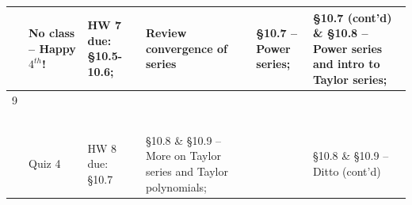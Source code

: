 \documentclass[11pt]{article}
\begin{document}
\begin{table}[ht!]
{\begin{tabular}{ | l | l | l | l | l | l |}
 & \begin{minipage}{0.18\textwidth}
No class -- Happy $4^{th}$!
 \end{minipage}
& \begin{minipage}{.18\textwidth}
HW 7 due: \S 10.5-10.6;
\end{minipage}
& \begin{minipage}{.18\textwidth}
Review convergence of series
\end{minipage}
& \begin{minipage}{.18\textwidth}
\S 10.7 -- Power series;
\end{minipage}
& \begin{minipage}{.18\textwidth}
\S 10.7 (cont'd) \& \S10.8 -- Power series and intro to Taylor series;
\end{minipage}\\
\hline

9 & \begin{minipage}{0.18\textwidth}
{\bf July 12}\\
\end{minipage}
& \begin{minipage}{.18\textwidth}
{\bf July 13}\\
\end{minipage}
& \begin{minipage}{.18\textwidth}
{\bf July 14}\\
\end{minipage}
& \begin{minipage}{.18\textwidth}
{\bf July 15}\\
\end{minipage}
& \begin{minipage}{.18\textwidth}
{\bf July 16}\\
\end{minipage}\\

& \begin{minipage}{0.18\textwidth}
Quiz 4
\end{minipage}
& \begin{minipage}{.18\textwidth}
HW 8 due: \S 10.7
\end{minipage}
& \begin{minipage}{.18\textwidth}
\S 10.8 \& \S10.9 -- More on Taylor series and Taylor polynomials;
\end{minipage}
& \begin{minipage}{.18\textwidth}
\end{minipage}
& \begin{minipage}{.18\textwidth}
     \S 10.8 \& \S10.9 -- Ditto (cont'd)
\end{minipage}\\
\hline


\end{tabular}}
\end{table}
\end{document}

